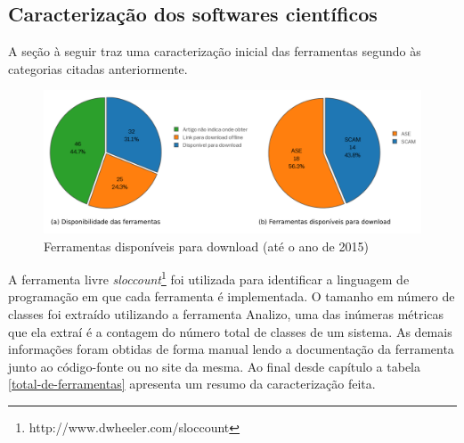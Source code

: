 \subsection{Caracterização dos softwares científicos}

A seção à seguir traz uma caracterização inicial das ferramentas segundo às
categorias citadas anteriormente.

\begin{figure}[h]
  \center
  \includegraphics[scale=0.85]{imagens/ferramentas-disponiveis.png}
  \caption{Ferramentas disponíveis para download (até o ano de 2015)}
  \label{ferramentas-disponiveis}
\end{figure}

A ferramenta livre {\it sloccount}\footnote{http://www.dwheeler.com/sloccount}
foi utilizada para identificar a linguagem de programação em que cada
ferramenta é implementada. O tamanho em número de classes foi extraído utilizando a ferramenta
Analizo, uma das inúmeras métricas que ela extraí é a contagem do número total
de classes de um sistema. As demais informações foram obtidas de forma manual
lendo a documentação da ferramenta junto ao código-fonte ou no site da mesma.
Ao final desde capítulo a tabela \ref{total-de-ferramentas} apresenta um resumo
da caracterização feita.

